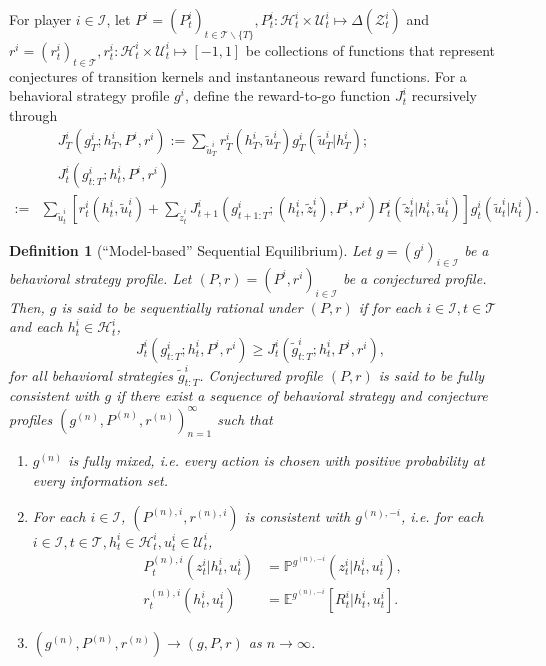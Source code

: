 \documentclass[pdflatex,sn-basic]{sn-jnl}
\newcommand{\E}{\mathbb{E}}
\renewcommand{\Pr}{\mathbb{P}}
\theoremstyle{thmstyleone}%
\theoremstyle{thmstyletwo}%
\theoremstyle{thmstylethree}%
\newtheorem{defn}{Definition}
\begin{document}
\begin{appendices}
For player $i\in\mathcal{I}$, let $P^i=(P_t^i)_{t\in\mathcal{T}\backslash\{T\}}, P_t^i\colon\mathcal{H}_t^i\times \mathcal{U}_t^i\mapsto \Delta(\mathcal{Z}_t^i)$ and $r^i=(r_t^i)_{t\in\mathcal{T}}, r_t^i\colon\mathcal{H}_t^i \times \mathcal{U}_t^i \mapsto [-1, 1]$ be collections of functions that represent conjectures of transition kernels and instantaneous reward functions. For a behavioral strategy profile $g^i$, define the reward-to-go function $J_t^i$ recursively through
\begin{subequations}\label{defofJ}
	\begin{align}
		&\quad~J_{T}^i(g_{T}^i; h_T^i, P^i, r^i) := \sum_{\tilde{u}_T^i} r_T^i(h_T^i, \tilde{u}_T^i) g_T^i(\tilde{u}_T^i|h_T^i);\label{defofJ:VT}\\
		&\quad~J_t^i(g_{t:T}^i; h_t^i, P^i, r^i)\label{defofJ:Vt} \\
		:= &\sum_{\tilde{u}_t^i} \left[ r_t^i(h_t^i, \tilde{u}_t^i) + \sum_{\tilde{z}_t^i} J_{t+1}^i(g_{t+1:T}^i; (h_t^i, \tilde{z}_t^i), P^i, r^i) P_t^i(\tilde{z}_t^i|h_t^i, \tilde{u}_t^i) \right] g_t^i(\tilde{u}_t^i|h_t^i).
	\end{align}
\end{subequations}

\begin{defn}[``Model-based'' Sequential Equilibrium]\label{def:PrSE}
	Let $g=(g^i)_{i\in\mathcal{I}}$ be a behavioral strategy profile. Let $(P, r)=(P^i, r^i)_{i\in\mathcal{I}}$ be a conjectured profile. Then, $g$ is said to be sequentially rational under $(P, r)$ if for each $i\in\mathcal{I}, t\in\mathcal{T}$ and each $h_t^i\in\mathcal{H}_t^i$, 
	\begin{equation}
		J_t^i(g_{t:T}^i; h_t^i, P^i, r^i)\geq J_t^i(\tilde{g}_{t:T}^i; h_t^i, P^i, r^i),
	\end{equation}
	for all behavioral strategies $\tilde{g}_{t:T}^i$. Conjectured profile $(P, r)$ is said to be fully consistent with $g$ if there exist a sequence of behavioral strategy and conjecture profiles  $(g^{(n)}, P^{(n)}, r^{(n)})_{n=1}^\infty$ such that
	\begin{enumerate}[(1)]
		\item $g^{(n)}$ is fully mixed, i.e. every action is chosen with positive probability at every information set.
		\item For each $i\in\mathcal{I}$, $(P^{(n), i}, r^{(n), i})$ is consistent with $g^{(n), -i}$, i.e. for each $i\in\mathcal{I}, t\in\mathcal{T}, h_t^i\in \mathcal{H}_t^i, u_t^i\in \mathcal{U}_t^i$,
		\begin{align}
			P_t^{(n), i}(z_t^i|h_t^i, u_t^i)&=\Pr^{g^{(n), -i}}(z_t^i|h_t^i, u_t^i),\\
			r_t^{(n), i}(h_t^i, u_t^i) &= \E^{g^{(n), -i}}[R_t^i|h_t^i, u_t^i].
		\end{align}
		\item $(g^{(n)}, P^{(n)}, r^{(n)})\rightarrow (g, P, r)$ as $n\rightarrow\infty$.
	\end{enumerate}
	

\end{defn}
\end{appendices}
\end{document}
